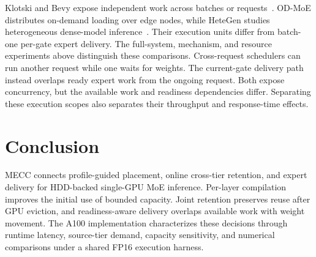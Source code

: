 \documentclass[conference,9pt,letterpaper]{IEEEtran}
\begin{document}
Klotski and Bevy expose independent work across batches or requests~\cite{klotski,bevy}. OD-MoE distributes on-demand loading over edge nodes, while HeteGen studies heterogeneous dense-model inference~\cite{odmoe,hetegen}. Their execution units differ from batch-one per-gate expert delivery. The full-system, mechanism, and resource experiments above distinguish these comparisons. Cross-request schedulers can run another request while one waits for weights. The current-gate delivery path instead overlaps ready expert work from the ongoing request. Both expose concurrency, but the available work and readiness dependencies differ. Separating these execution scopes also separates their throughput and response-time effects.



\section{Conclusion}
MECC connects profile-guided placement, online cross-tier retention, and expert delivery for HDD-backed single-GPU MoE inference. Per-layer compilation improves the initial use of bounded capacity. Joint retention preserves reuse after GPU eviction, and readiness-aware delivery overlaps available work with weight movement. The A100 implementation characterizes these decisions through runtime latency, source-tier demand, capacity sensitivity, and numerical comparisons under a shared FP16 execution harness.

\clearpage
\nobalance
{}


\end{document}
